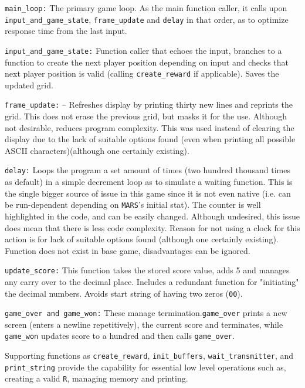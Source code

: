 \documentclass[12pt]{article}
\begin{document}
\par\texttt{main\_loop:} The primary game loop. As the main function caller, it calls upon \texttt{input\_and\_game\_state}, \texttt{frame\_update} and \texttt{delay} in that order, as to optimize response time from the last input.
\par\texttt{input\_and\_game\_state:} Function caller that echoes the input, branches to a function to create the next player position depending on input and checks that next player position is valid (calling \texttt{create\_reward} if applicable). Saves the updated grid.
\par\texttt{frame\_update:} – Refreshes display by printing thirty new lines and reprints the grid. This does not erase the previous grid, but masks it for the use. Although not desirable, reduces program complexity. This was used instead of clearing the display due to the lack of suitable options found (even when printing all possible ASCII characters)(although one certainly existing). 
\par\texttt{delay:} Loops the program a set amount of times (two hundred thousand times as default) in a simple decrement loop as to simulate a waiting function. This is the single bigger source of issue in this game since it is not even native (i.e. can be run-dependent depending on \texttt{MARS}'s initial stat). The counter is well highlighted in the code, and can be easily changed. Although undesired, this issue does mean that there is less code complexity. Reason for not using a clock for this action is for lack of suitable options found (although one certainly existing). Function does not exist in base game, disadvantages can be ignored.
\par\texttt{update\_score:} This function takes the stored score value, adds 5 and manages any carry over to the decimal place. Includes a redundant function for "initiating" the decimal numbers. Avoids start string of having two zeros (\texttt{00}). 
\par\texttt{game\_over and game\_won:} These manage termination.\texttt{game\_over} prints a new screen (enters a newline repetitively), the current score and terminates, while \texttt{game\_won} updates score to a hundred and then calls \texttt{game\_over}.
\par Supporting functions as \texttt{create\_reward}, \texttt{init\_buffers}, \texttt{wait\_transmitter}, and \texttt{print\_string} provide the capability for essential low level operations such as, creating a valid \texttt{R}, managing memory and printing.\\
\end{document}
